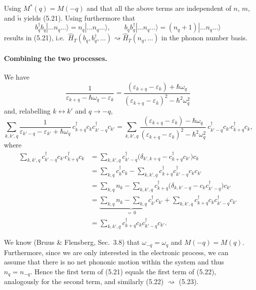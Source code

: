 \documentclass[../../main.tex]{subfiles}
\begin{document}
Using $M^*(q)=M(-q)$ and that all the above terms are independent of $n$, $m$, and
$\tilde n$ yields (5.21). Using furthermore that
\begin{equation}
b^\dagger_q b_q|\dots n_q\dots\rangle=n_q|\dots n_q\dots\rangle,\qquad
b_q b^\dagger_q|\dots n_q\dots\rangle=(n_q+1)|\dots n_q\dots\rangle
\end{equation}
results in (5.21), i.e.\ $\hat H_T(b_q,b^\dagger_q,\dots)\rightsquigarrow
\hat H_T(n_q,\dots)$ in the phonon number basis.

\paragraph{Combining the two processes.}
We have
\begin{equation}
\frac{1}{\varepsilon_{k+q}-\hbar\omega_q-\varepsilon_k}
=\frac{(\varepsilon_{k+q}-\varepsilon_k)+\hbar\omega_q}
      {(\varepsilon_{k+q}-\varepsilon_k)^2-\hbar^2\omega_q^2}
\end{equation}
and, relabelling $k\leftrightarrow k'$ and $q\to-q$,
\begin{equation}
\sum_{k,k',q}\frac{1}{\varepsilon_{k'-q}-\varepsilon_{k'}+\hbar\omega_q}\,
c^\dagger_{k+q}c_k c^\dagger_{k'-q}c_{k'}
=\sum_{k,k',q}\frac{(\varepsilon_{k+q}-\varepsilon_k)-\hbar\omega_q}
      {(\varepsilon_{k+q}-\varepsilon_k)^2-\hbar^2\omega_q^2}\,
c^\dagger_{k'-q}c_{k'}c^\dagger_{k+q}c_k ,
\end{equation}
where
\begin{align}
\sum_{k,k',q}c^\dagger_{k'-q}c_{k'}c^\dagger_{k+q}c_k
&=\sum_{k,k',q}c^\dagger_{k'-q}\big(\delta_{k',k+q}-c^\dagger_{k+q}c_{k'}\big)c_k\\
&=\sum_{k,q}c^\dagger_k c_k-\sum_{k,k',q}c^\dagger_{k+q}c^\dagger_{k'-q}c_k c_{k'}\\
&=\sum_{k,q}n_k-\sum_{k,k',q}c^\dagger_{k+q}
   \big(\delta_{k,k'-q}-c_k c^\dagger_{k'-q}\big)c_{k'}\\
&=\underbrace{\sum_{k,q}n_k-\sum_{k,q}c^\dagger_{k'}c_{k'}}_{=\,0}
  +\sum_{k,k',q}c^\dagger_{k+q}c_k c^\dagger_{k'-q}c_{k'}\\
&=\sum_{k,k',q}c^\dagger_{k+q}c_k c^\dagger_{k'-q}c_{k'} .
\end{align}

We know (Bruus \& Flensberg, Sec.~3.8) that $\omega_{-q}=\omega_q$ and $M(-q)=M(q)$.
Furthermore, since we are only interested in the electronic process, we can assume that
there is no net phononic motion within the system and thus $n_q=n_{-q}$.
Hence the first term of (5.21) equals the first term of (5.22), analogously for the
second term, and similarly (5.22) $\rightsquigarrow$ (5.23).
\end{document}
